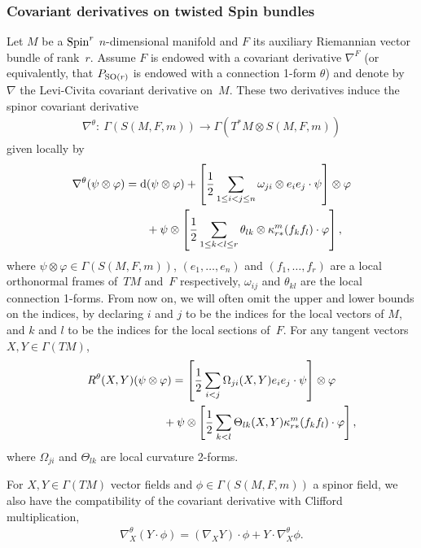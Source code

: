 \documentclass[10pt,a4paper]{amsart}
\newcommand{\lra}{\longrightarrow}
\numberwithin{equation}{section}
\begin{document}
\subsubsection{Covariant derivatives on twisted Spin bundles}

Let $M$ be a ${\rm Spin}^r$ $n$-dimensional manifold and $F$ its auxiliary Riemannian vector bundle of rank~$r$. Assume $F$ is endowed with a covariant derivative $\nabla^F$ (or equivalently, that $P_{{\rm SO}(r)}$ is endowed with a connection 1-form $\theta$) and denote by~$\nabla$ the Levi-Civita covariant derivative on~$M$. These two derivatives induce the spinor covariant derivative
\begin{gather*}\nabla^{\theta}\colon \ \Gamma(S(M,F,m))\lra \Gamma(T^*M\otimes S(M,F,m))\end{gather*}
given locally by
\begin{gather*}\nabla^{\theta} (\psi\otimes \varphi) ={\rm d}(\psi\otimes\varphi)
+\left[{1\over 2}\sum_{1\leq i<j\leq n}\omega_{ji}\otimes e_ie_j\cdot\psi\right] \otimes\varphi\\
\hphantom{\nabla^{\theta} (\psi\otimes \varphi) =}{}
+\psi\otimes\left[{1\over 2}\sum_{1\leq k<l\leq r}\theta_{lk}\otimes \kappa_{r*}^m(f_kf_l)\cdot
\varphi\right] ,\end{gather*}
where $\psi\otimes\varphi\in\Gamma(S(M,F,m))$, $(e_1,\dots,e_n)$ and $(f_1,\dots,f_r)$ are a local orthonormal frames of~$TM$ and~$F$ respectively, $\omega_{ij}$ and $\theta_{kl}$ are the local connection 1-forms. From now on, we will often omit the upper and lower bounds on the indices, by declaring $i$ and $j$ to be the indices for the local vectors of $M$, and $k$ and $l$ to be the indices for the local sections of~$F$. For any tangent vectors $X,Y\in \Gamma(TM)$,{\samepage
\begin{gather}
R^{\theta}(X,Y)(\psi\otimes\varphi)= \left[{1\over 2} \sum_{i<j} \Omega_{ji}(X,Y) e_ie_j\cdot\psi\right]\otimes\varphi\nonumber\\
\hphantom{R^{\theta}(X,Y)(\psi\otimes\varphi)=}{}+ \psi\otimes\left[{1\over 2} \sum_{k<l} \Theta_{lk}(X,Y) \kappa_{r*}^m(f_kf_l)\cdot\varphi\right],\label{eq: basic curvature identity}
\end{gather}
where $\Omega_{ji}$ and $\Theta_{lk}$ are local curvature 2-forms.}

For $X, Y\in\Gamma(TM)$ vector fields and $\phi\in\Gamma(S(M,F,m))$ a spinor field, we also have the compatibility of the covariant derivative with Clifford multiplication,
\begin{gather*}
\nabla^{\theta}_X(Y\cdot\phi) = (\nabla_XY)\cdot\phi + Y\cdot\nabla_X^{\theta}\phi.
\end{gather*}
\end{document}
